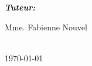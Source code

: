 \documentclass[12pt]{report}
\begin{document}
\begin{center}
\begin{minipage}[t]{.5\textwidth}
\end{minipage}\hfill\begin{minipage}[t]{.4\textwidth}

\begin{flushright}
\emph{\textbf{\Large Tuteur:}}

Mme. Fabienne Nouvel\\
\end{flushright}
\end{minipage}
\\[1cm]

{\today}\\[3cm]
\end{center}
\afterpage{\null\newpage}



\pagebreak 
\pagestyle{fancy}
\fancyhead{}


\pagebreak 






\printbibliography




\end{document}
